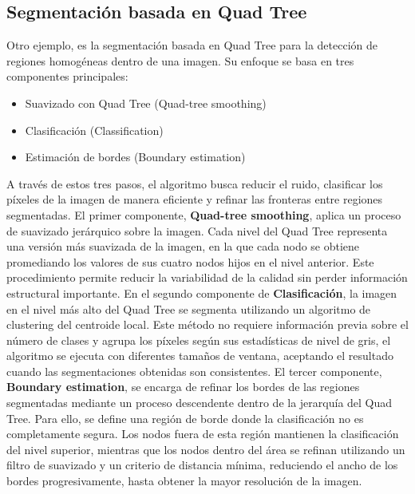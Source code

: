 \documentclass[9pt,a4paper,twoside]{rho-class/rho}
\begin{document}
        \subsection{Segmentación basada en Quad Tree}
            Otro ejemplo, es la segmentación basada en Quad Tree para la detección de regiones homogéneas dentro de una imagen. Su enfoque se basa en tres componentes principales:
            \begin{itemize}
                \item Suavizado con Quad Tree (Quad-tree smoothing)
                \item Clasificación (Classification)
                \item Estimación de bordes (Boundary estimation)
            \end{itemize}
            A través de estos tres pasos, el algoritmo busca reducir el ruido, clasificar los píxeles de la imagen de manera eficiente y refinar las fronteras entre regiones segmentadas.
            El primer componente, \textbf{Quad-tree smoothing}, aplica un proceso de suavizado jerárquico sobre la imagen. Cada nivel del Quad Tree representa una versión más suavizada de la imagen, en la que cada nodo se obtiene promediando los valores de sus cuatro nodos hijos en el nivel anterior. Este procedimiento permite reducir la variabilidad de la calidad sin perder información estructural importante.
            En el segundo componente de \textbf{Clasificación}, la imagen en el nivel más alto del Quad Tree se segmenta utilizando un algoritmo de clustering del centroide local. Este método no requiere información previa sobre el número de clases y agrupa los píxeles según sus estadísticas de nivel de gris, el algoritmo se ejecuta con diferentes tamaños de ventana, aceptando el resultado cuando las segmentaciones obtenidas son consistentes.
            El tercer componente, \textbf{Boundary estimation}, se encarga de refinar los bordes de las regiones segmentadas mediante un proceso descendente dentro de la jerarquía del Quad Tree. Para ello, se define una región de borde donde la clasificación no es completamente segura. Los nodos fuera de esta región mantienen la clasificación del nivel superior, mientras que los nodos dentro del área se refinan utilizando un filtro de suavizado y un criterio de distancia mínima, reduciendo el ancho de los bordes progresivamente, hasta obtener la mayor resolución de la imagen. \cite{spann_wilson_quadtree}
\end{document}
